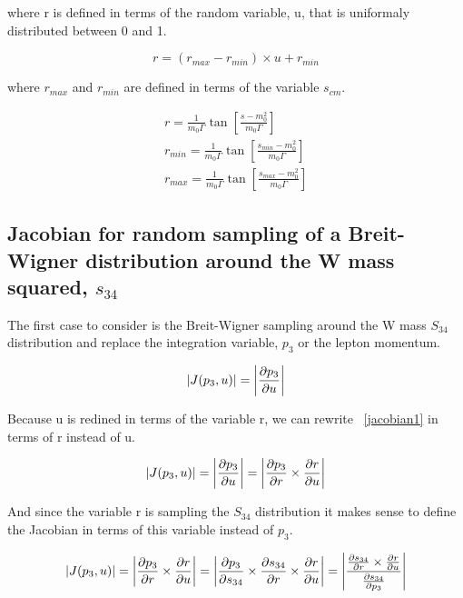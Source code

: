 where r is defined in terms of the random variable, u, that is uniformaly
distributed between 0 and 1.

\begin{equation}
\label{rtou}
r = (r_{max} - r_{min}) \times u + r_{min}
\end{equation}

where $r_{max}$ and $r_{min}$ are defined in terms of the variable $s_{cm}$.

\begin{eqnarray}
\label{definer}
r = \frac{1}{m_{0}\Gamma} \tan \left[ \frac{s - m_{0}^{2}}{m_{0}\Gamma} \right] \\
r_{min} = \frac{1}{m_{0}\Gamma} \tan \left[ \frac{s_{min} -
m_{0}^{2}}{m_{0}\Gamma} \right] \\
r_{max} = \frac{1}{m_{0}\Gamma} \tan \left[ \frac{s_{max} - m_{0}^{2}}{m_{0}\Gamma} \right]
\end{eqnarray}



\subsection{Jacobian for random sampling of a Breit-Wigner distribution around
the W mass squared, $s_{34}$}

The first case to consider is the Breit-Wigner sampling around the W mass
$S_{34}$ distribution and replace the integration variable, $p_{3}$ or the
lepton momentum.

\begin{equation}
\label{jacobian1}
|J(p_{3}, u)| = \left| \frac{\partial p_{3}}{\partial u} \right| 
\end{equation}

Because u is redined in terms of the variable r, we can rewrite ~\ref{jacobian1}
in terms of r instead of u.

\begin{equation}
\label{jacobian2}
|J(p_{3}, u)| = \left| \frac{\partial p_{3}}{\partial u} \right| = \left| \frac{\partial p_{3}}{\partial r}
\times \frac{\partial r}{\partial u} \right|
\end{equation}

And since the variable r is sampling the $S_{34}$ distribution it makes sense to
define the Jacobian in terms of this variable instead of $p_{3}$.

\begin{equation}
\label{jacobian3}
|J(p_{3}, u)| = \left| \frac{\partial p_{3}}{\partial r} \times \frac{\partial r}{\partial u} \right| = \left|
\frac{\partial p_{3}}{\partial s_{34}} \times \frac{\partial s_{34}}{\partial r} \times \frac{\partial r}{\partial u} \right| =
\left | \frac{\frac{\partial s_{34}}{\partial r} \times
\frac{\partial r}{\partial u}}{\frac{\partial s_{34}}{\partial p_{3}}} \right |
\end{equation}

